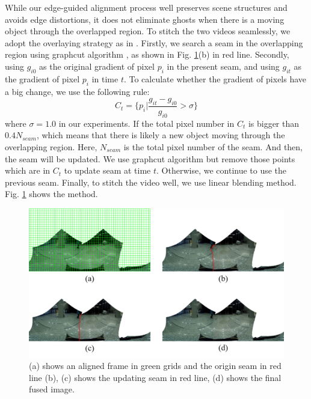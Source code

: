 \documentclass[conference]{IEEEtran}
\begin{document}
While our edge-guided alignment process well preserves scene structures and avoids edge distortions, it does not eliminate ghosts when there is a moving object through the overlapped region.
To stitch the two videos seamlessly, we adopt the overlaying strategy as in \cite{he2016parallax}. 
Firstly, we search a seam in the overlapping region using graphcut algorithm \cite{boykov2004experimental}, as shown in Fig. \ref{fig:p24}(b) in red line.
Secondly, using $g_{i0}$ as the original gradient of pixel $p_i$ in the present seam, and using $g_{it}$ as the gradient of pixel $p_i$ in time $t$. To calculate whether the gradient
of pixels have a big change, we use the following rule:
\begin{equation}
\textit{C}_{t}=\{p_{i}|\frac{g_{it}-g_{i0}}{g_{i0}}>\sigma\}
\end{equation}
where $\sigma=1.0$ in our experiments.
If the total pixel number in $\textit{C}_t$ is bigger than $0.4N_{seam}$, which means that there is likely a new object moving through the overlapping region. 
Here, $N_{seam}$ is the total pixel number of the seam. 
And then, the seam will be updated. We use graphcut algorithm but remove those points which are in $C_t$ to update seam at time $t$. 
Otherwise, we continue to use the previous seam.
Finally, to stitch the video well, we use linear blending method.
Fig. \ref{fig:p24} shows the method.
\begin{figure}[h]
\centering
\includegraphics[scale=0.42]{picture48.png}
\caption{(a) shows an aligned frame in green grids and the origin seam in red line (b), (c) shows the updating seam in red line, (d) shows the final fused image.}
\label{fig:p24}
\end{figure}
\end{document}

